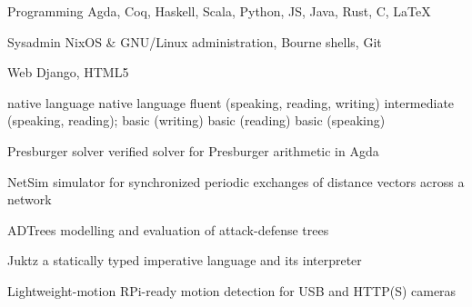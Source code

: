 \documentclass[11pt, a4paper]{awesome-cv}
\begin{document}
\noindent
\begin{minipage}[t]{0.55\linewidth}
\vspace{0.21\baselineskip}
\begin{cvskills}
    \cvskill
      {Programming} %
      {Agda, Coq, Haskell, Scala, Python, JS, Java, Rust, C, LaTeX} %
  
    \cvskill
      {Sysadmin} %
      {NixOS \& GNU/Linux administration, Bourne shells, Git} %
  
    \cvskill
      {Web} %
      {Django, HTML5} %
\end{cvskills}
\end{minipage}%
\hspace{0.05\linewidth}
\begin{minipage}[t]{0.4\linewidth}
\begin{cvskills}
     {native language}
     {native language}
     {fluent (speaking, reading, writing)}
     {
        intermediate (speaking, reading);\newline
        basic (writing)}
     {basic (reading)}
     {basic (speaking)}
\end{cvskills}
\end{minipage}


\begin{cvskills}
    \cvskill
        {Presburger solver}
        {verified solver for Presburger arithmetic in Agda}

    \cvskill
        {NetSim}
        {simulator for synchronized periodic exchanges of distance vectors
        across a network}

    \cvskill
        {ADTrees}
        {modelling and evaluation of attack-defense trees}

    \cvskill
        {Juktz}
        {a statically typed imperative language and its interpreter}

    \cvskill
        {Lightweight-motion}
        {RPi-ready motion detection for USB and HTTP(S) cameras}
\end{cvskills}
\end{document}
